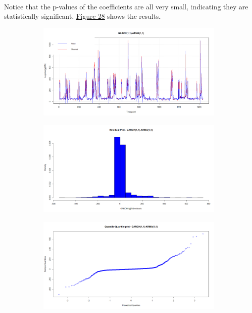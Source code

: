 \documentclass[12pt]{article}
\begin{document}
\paragraph{}
Notice that the p-values of the coefficients are all very small, indicating they are statistically significant. \href{figure28}{Figure 28} shows the results.
\begin{figure}[H]
  \centering
  \begin{subfigure}[b]{0.49\linewidth}
    \includegraphics[width=\linewidth]{figure27-1.png}
  \end{subfigure}
  \begin{subfigure}[b]{0.49\linewidth}
    \includegraphics[width=\linewidth]{figure27-2.png}
  \end{subfigure}
  \begin{subfigure}[b]{0.49\linewidth}
    \includegraphics[width=\linewidth]{figure27-3.png}

\end{subfigure}
\end{figure}
\end{document}
